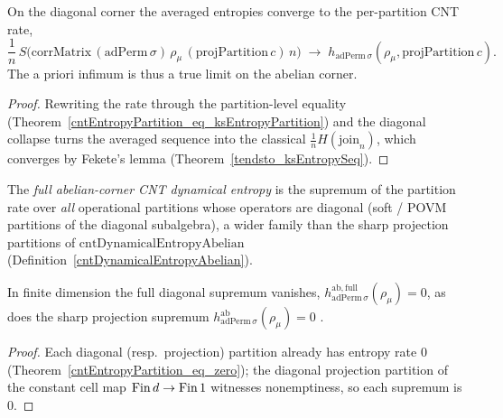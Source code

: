 \begin{theorem}\label{tendsto_cntEntropyPartition_abelian}
  \leanok
  On the diagonal corner the averaged entropies converge to the per-partition CNT rate,
  \[
    \frac1n\,S\bigl(\mathrm{corrMatrix}\,(\mathrm{adPerm}\,\sigma)\,\rho_\mu\,(\mathrm{projPartition}\,c)\,n\bigr)
      \;\longrightarrow\; h_{\mathrm{adPerm}\,\sigma}(\rho_\mu,\mathrm{projPartition}\,c).
  \]
  The a priori infimum is thus a true limit on the abelian corner.
\end{theorem}
\begin{proof}\leanok
  Rewriting the rate through the partition-level equality
  (Theorem~\ref{cntEntropyPartition_eq_ksEntropyPartition}) and the diagonal collapse turns the
  averaged sequence into the classical \(\frac1n H(\text{join}_n)\), which converges by Fekete's
  lemma (Theorem~\ref{tendsto_ksEntropySeq}).
\end{proof}

\begin{definition}\label{cntDynamicalEntropyAbelianFull}
  \leanok
  The \emph{full abelian-corner CNT dynamical entropy} is the supremum of the partition rate over
  \emph{all} operational partitions whose operators are diagonal (soft / POVM partitions of the
  diagonal subalgebra), a wider family than the sharp projection partitions of
  \(\mathrm{cntDynamicalEntropyAbelian}\) (Definition~\ref{cntDynamicalEntropyAbelian}).
\end{definition}

\begin{theorem}\label{cntDynamicalEntropyAbelianFull_eq_zero}
  \leanok
  In finite dimension the full diagonal supremum vanishes,
  \(h^{\mathrm{ab,full}}_{\mathrm{adPerm}\,\sigma}(\rho_\mu) = 0\), as does the sharp projection
  supremum \(h^{\mathrm{ab}}_{\mathrm{adPerm}\,\sigma}(\rho_\mu) = 0\)
  .
\end{theorem}
\begin{proof}\leanok
  Each diagonal (resp.\ projection) partition already has entropy rate \(0\)
  (Theorem~\ref{cntEntropyPartition_eq_zero}); the diagonal projection partition of the constant cell
  map \(\operatorname{Fin} d\to\operatorname{Fin} 1\) witnesses nonemptiness, so each supremum is \(0\).
\end{proof}

